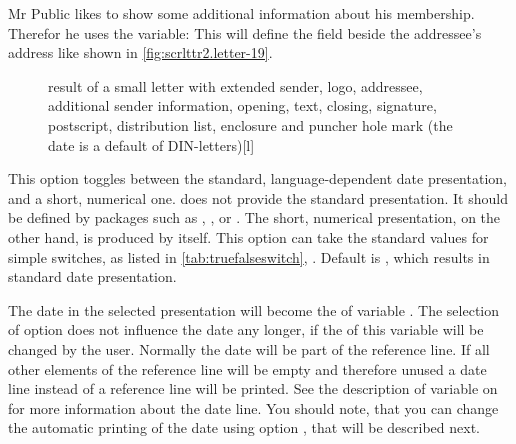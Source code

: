 \begin{Example}
  Mr Public likes to show some additional information about his
  membership. Therefor he uses the  variable:%
  This will define the field beside the addressee's address like shown in
  \autoref{fig:scrlttr2.letter-19}.
  \begin{figure}
    \setcapindent{0pt}%
    \begin{captionbeside}
      {result of a small letter with extended sender, logo,
        addressee, additional sender information, opening, text, closing,
        signature, postscript, distribution list, enclosure and puncher hole
        mark (the date is a default of DIN-letters)}[l]
    \end{captionbeside}
    \label{fig:scrlttr2.letter-19}
  \end{figure}
\end{Example}
%
\EndIndexGroup
%
\EndIndexGroup


\begin{Declaration}
\end{Declaration}
This option toggles between the standard, language-dependent
date presentation, and a short, numerical
one. {\KOMAScript} does not provide the standard presentation. It should be
defined by packages such as ,
, or
. The
short, numerical presentation, on the other hand, is produced by
 itself. This option can take the standard values for simple
switches, as listed in \autoref{tab:truefalseswitch},
. Default is , which results in
standard date presentation.

\begin{Declaration}
\end{Declaration}
The date in the selected presentation will become the  of
variable . The selection of option 
does not influence the date any longer, if the  of this variable
will be changed by the user. Normally the date will be part of the reference
line. If all other elements of the reference line will be empty and therefore
unused a date line instead of a reference line will be printed. See the
description of variable  on
 for more information about
the date line. You should note, that you can change the automatic printing of
the date using option , that will be described next.
%
\EndIndexGroup
\EndIndexGroup


